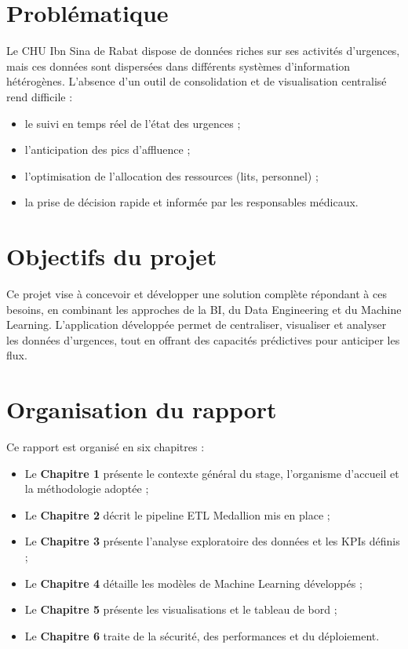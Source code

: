 \documentclass[12pt,a4paper]{report}
\begin{document}
	\section*{Problématique}
	
	Le CHU Ibn Sina de Rabat dispose de données riches sur ses activités d'urgences, mais ces
	données sont dispersées dans différents systèmes d'information hétérogènes. L'absence d'un
	outil de consolidation et de visualisation centralisé rend difficile :
	\begin{itemize}
		\item le suivi en temps réel de l'état des urgences ;
		\item l'anticipation des pics d'affluence ;
		\item l'optimisation de l'allocation des ressources (lits, personnel) ;
		\item la prise de décision rapide et informée par les responsables médicaux.
	\end{itemize}
	
	\section*{Objectifs du projet}
	
	Ce projet vise à concevoir et développer une solution complète répondant à ces besoins, en
	combinant les approches de la BI, du Data Engineering et du Machine Learning. L'application
	développée permet de centraliser, visualiser et analyser les données d'urgences, tout en
	offrant des capacités prédictives pour anticiper les flux.
	
	\section*{Organisation du rapport}
	
	Ce rapport est organisé en six chapitres :
	\begin{itemize}
		\item Le \textbf{Chapitre 1} présente le contexte général du stage, l'organisme d'accueil
		et la méthodologie adoptée ;
		\item Le \textbf{Chapitre 2} décrit le pipeline ETL Medallion mis en place ;
		\item Le \textbf{Chapitre 3} présente l'analyse exploratoire des données et les KPIs définis ;
		\item Le \textbf{Chapitre 4} détaille les modèles de Machine Learning développés ;
		\item Le \textbf{Chapitre 5} présente les visualisations et le tableau de bord ;
		\item Le \textbf{Chapitre 6} traite de la sécurité, des performances et du déploiement.
	\end{itemize}
	
\end{document}
